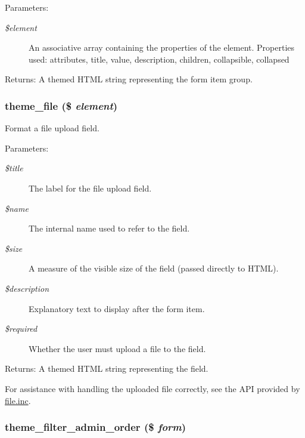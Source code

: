 \begin{Desc}
\item[Parameters:]
\begin{description}
\item[{\em \$element}]An associative array containing the properties of the element. Properties used: attributes, title, value, description, children, collapsible, collapsed \end{description}
\end{Desc}
\begin{Desc}
\item[Returns:]A themed HTML string representing the form item group. \end{Desc}
\hypertarget{group__themeable_g4c407a3bdc1e335e3b863f7ee747ef4d}{
\subsubsection[{theme\_\-file}]{\setlength{\rightskip}{0pt plus 5cm}theme\_\-file (\$ {\em element})}}
\label{group__themeable_g4c407a3bdc1e335e3b863f7ee747ef4d}


Format a file upload field.

\begin{Desc}
\item[Parameters:]
\begin{description}
\item[{\em \$title}]The label for the file upload field. \item[{\em \$name}]The internal name used to refer to the field. \item[{\em \$size}]A measure of the visible size of the field (passed directly to HTML). \item[{\em \$description}]Explanatory text to display after the form item. \item[{\em \$required}]Whether the user must upload a file to the field. \end{description}
\end{Desc}
\begin{Desc}
\item[Returns:]A themed HTML string representing the field.\end{Desc}
For assistance with handling the uploaded file correctly, see the API provided by \hyperlink{file_8inc}{file.inc}. \hypertarget{group__themeable_g2043f70c09f1b97fed7917c783bb774c}{
\subsubsection[{theme\_\-filter\_\-admin\_\-order}]{\setlength{\rightskip}{0pt plus 5cm}theme\_\-filter\_\-admin\_\-order (\$ {\em form})}}
\label{group__themeable_g2043f70c09f1b97fed7917c783bb774c}


